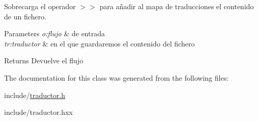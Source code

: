 Sobrecarga el operador $>$$>$ para añadir al mapa de traducciones el contenido de un fichero. 


\begin{DoxyParams}{Parameters}
{\em o\+:flujo} & de entrada \\
\hline
{\em tr\+:traductor} & en el que guardaremos el contenido del fichero \\
\hline
\end{DoxyParams}
\begin{DoxyReturn}{Returns}
Devuelve el flujo 
\end{DoxyReturn}


The documentation for this class was generated from the following files\+:\begin{DoxyCompactItemize}
\item 
include/\hyperlink{traductor_8h}{traductor.\+h}\item 
include/traductor.\+hxx\end{DoxyCompactItemize}
